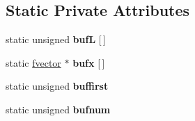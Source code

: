 \subsection*{Static Private Attributes}
\begin{DoxyCompactItemize}
\item 
static unsigned {\bfseries bufL} \mbox{[}$\,$\mbox{]}\hypertarget{classvmatrix_a34846b3c8ecc2cb88656d1c0dfe5c510}{}\label{classvmatrix_a34846b3c8ecc2cb88656d1c0dfe5c510}

\item 
static \hyperlink{classfvector}{fvector} $\ast$ {\bfseries bufx} \mbox{[}$\,$\mbox{]}\hypertarget{classvmatrix_a4d9867551b6d7b54ddeb2d027887cd8a}{}\label{classvmatrix_a4d9867551b6d7b54ddeb2d027887cd8a}

\item 
static unsigned {\bfseries buffirst}\hypertarget{classvmatrix_a731e00792ccfa7201fe2190b5f242e7e}{}\label{classvmatrix_a731e00792ccfa7201fe2190b5f242e7e}

\item 
static unsigned {\bfseries bufnum}\hypertarget{classvmatrix_ac00b28e8d55f8f6fc49d53ab41ccc3ac}{}\label{classvmatrix_ac00b28e8d55f8f6fc49d53ab41ccc3ac}

\end{DoxyCompactItemize}
